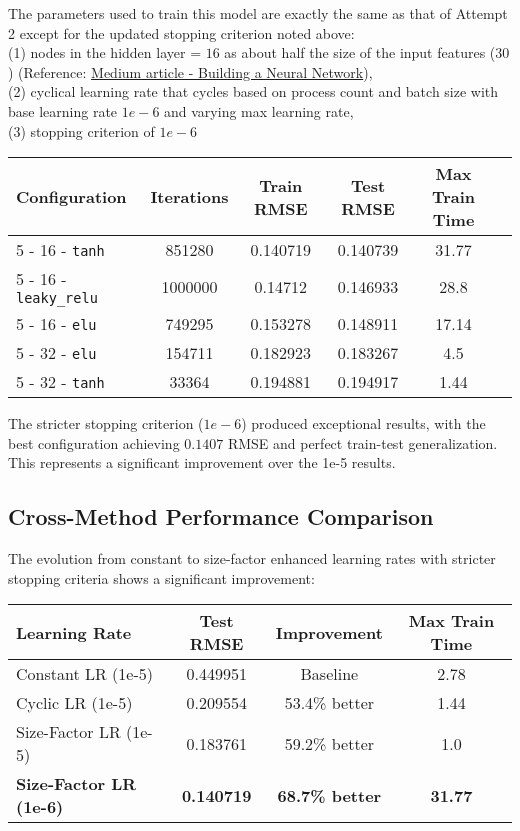 \documentclass{article}
\begin{document}
The parameters used to train this model are exactly the same as that of Attempt 2 except for the updated stopping criterion noted above: \\
(1) nodes in the hidden layer = $16$ as about half the size of the input features ($30$) (Reference: \href{https://medium.com/data-science/17-rules-of-thumb-for-building-a-neural-network-93356f9930af}{Medium article - Building a Neural Network}), \\
(2) cyclical learning rate that cycles based on process count and batch size with base learning rate $1e-6$ and varying max learning rate, \\
(3) stopping criterion of $1e-6$ \\

\begin{center}
\begin{tabular}{|l|c|c|c|c|c|}
\hline
Configuration & Iterations & Train RMSE & Test RMSE & Max Train Time \\
\hline
5 - 16 - \verb|tanh| & 851280 & 0.140719 & 0.140739 & 31.77 \\
5 - 16 - \verb|leaky_relu| & 1000000 & 0.14712 & 0.146933 & 28.8 \\
5 - 16 - \verb|elu| & 749295 & 0.153278 & 0.148911 & 17.14 \\
5 - 32 - \verb|elu| & 154711 & 0.182923 & 0.183267 & 4.5 \\
5 - 32 - \verb|tanh| & 33364 & 0.194881 & 0.194917 & 1.44 \\
\hline
\end{tabular}
\end{center}

The stricter stopping criterion ($1e-6$) produced exceptional results, with the best configuration achieving $0.1407$ RMSE and perfect train-test generalization. This represents a significant improvement over the 1e-5 results.

\subsection{Cross-Method Performance Comparison}
The evolution from constant to size-factor enhanced learning rates with stricter stopping criteria shows a significant improvement:

\begin{center}
\begin{tabular}{|l|c|c|c|}
\hline
Learning Rate & Test RMSE & Improvement & Max Train Time\\
\hline
Constant LR (1e-5) & 0.449951 & Baseline & 2.78 \\
Cyclic LR (1e-5) & 0.209554 & 53.4\% better & 1.44 \\
Size-Factor LR (1e-5) & 0.183761 & 59.2\% better & 1.0 \\
\textbf{Size-Factor LR (1e-6)} & \textbf{0.140719} & \textbf{68.7\% better} & \textbf{31.77} \\
\hline
\end{tabular}
\end{center}
\end{document}
